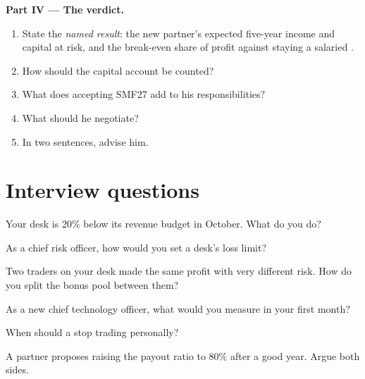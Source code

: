 \begin{problem}
\medskip\noindent\textbf{Part IV --- The verdict.}
\begin{enumerate}[resume]
\item State the \emph{named result}: the new partner's expected five-year income and capital at risk, and the
break-even share of profit against staying a salaried .
\item How should the capital account be counted?
\item What does accepting SMF27 add to his responsibilities?
\item What should he negotiate?
\item In two sentences, advise him.
\end{enumerate}
\end{problem}

\section{Interview questions}

\begin{interviewq}\label{iq:in:leadership-roles:1}
Your desk is 20\% below its revenue budget in October. What do you do?
\end{interviewq}

\begin{interviewq}\label{iq:in:leadership-roles:2}
As a chief risk officer, how would you set a desk's loss limit?
\end{interviewq}

\begin{interviewq}\label{iq:in:leadership-roles:3}
Two traders on your desk made the same profit with very different risk. How do you split the bonus pool between them?
\end{interviewq}

\begin{interviewq}\label{iq:in:leadership-roles:4}
As a new chief technology officer, what would you measure in your first month?
\end{interviewq}

\begin{interviewq}\label{iq:in:leadership-roles:5}
When should a  stop trading personally?
\end{interviewq}

\begin{interviewq}\label{iq:in:leadership-roles:6}
A partner proposes raising the payout ratio to 80\% after a good year. Argue both sides.
\end{interviewq}
